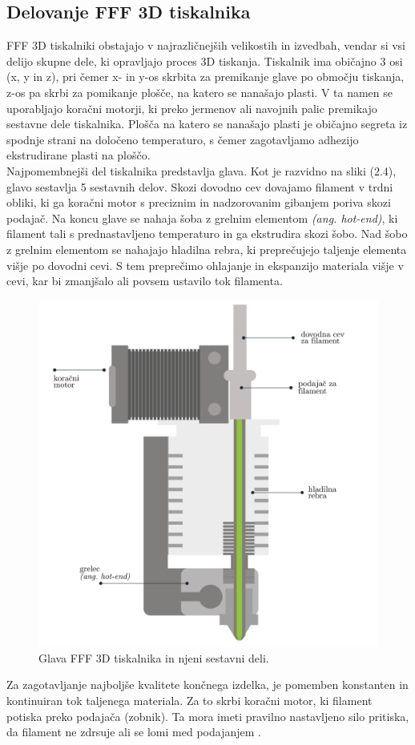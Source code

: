 \documentclass[12pt]{report}
\begin{document}
\subsection{Delovanje \ac{FFF} 3D tiskalnika}
\ac{FFF} 3D tiskalniki obstajajo v najrazličnejših velikostih in izvedbah, vendar si vsi delijo skupne dele, ki opravljajo proces 3D tiskanja. Tiskalnik ima običajno 3 osi (x, y in z), pri čemer x- in y-os skrbita za premikanje glave po
območju tiskanja, z-os pa skrbi za pomikanje plošče, na katero se nanašajo plasti. V ta namen se uporabljajo koračni motorji, ki preko jermenov ali navojnih palic premikajo sestavne dele tiskalnika. Plošča na katero se nanašajo plasti je običajno segreta iz spodnje strani na določeno temperaturo, s čemer zagotavljamo
adhezijo ekstrudirane plasti na ploščo. \\
Najpomembnejši del tiskalnika predstavlja glava. Kot je razvidno na sliki (2.4), glavo sestavlja 5 sestavnih delov. Skozi dovodno cev dovajamo filament v trdni obliki, ki ga koračni motor s preciznim in nadzorovanim gibanjem poriva skozi podajač. Na koncu glave se nahaja šoba z grelnim elementom \emph{(ang. hot-end)}, ki filament tali s prednastavljeno temperaturo
in ga ekstrudira skozi šobo. Nad šobo z grelnim elementom se nahajajo hladilna rebra, ki preprečujejo taljenje elementa višje po dovodni cevi. S tem preprečimo ohlajanje in ekspanzijo materiala višje v cevi, kar bi zmanjšalo ali povsem ustavilo tok filamenta.
\begin{figure}[H]
  \centering
  \includegraphics[scale=0.5]{Images/extruder.png}
  \caption{Glava FFF 3D tiskalnika in njeni sestavni deli. \cite{leapfrog}}
\end{figure}
\noindent Za zagotavljanje najboljše kvalitete končnega izdelka, je pomemben konstanten in kontinuiran tok taljenega materiala. Za to skrbi koračni motor, ki filament potiska preko
podajača (zobnik). Ta mora imeti pravilno nastavljeno silo pritiska, da filament ne zdrsuje ali se lomi med podajanjem \cite{fff_article}.
\end{document}
